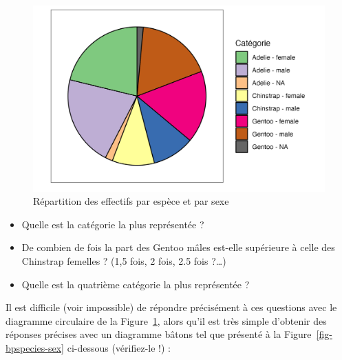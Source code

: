 \documentclass[
  letterpaper,
  DIV=11,
  numbers=noendperiod]{scrreprt}
\providecommand{\tightlist}{%
  \setlength{\itemsep}{0pt}\setlength{\parskip}{0pt}}\usepackage{longtable,booktabs,array}
\begin{document}
\begin{figure}

{\centering \includegraphics{./03-visualization_files/figure-pdf/fig-pie-1.png}

}

\caption{\label{fig-pie}Répartition des effectifs par espèce et par
sexe}

\end{figure}

\begin{itemize}
\tightlist
\item
  Quelle est la catégorie la plus représentée ?
\item
  De combien de fois la part des Gentoo mâles est-elle supérieure à
  celle des Chinstrap femelles ? (1,5 fois, 2 fois, 2.5 fois ?\ldots)
\item
  Quelle est la quatrième catégorie la plus représentée ?
\end{itemize}

Il est difficile (voir impossible) de répondre précisément à ces
questions avec le diagramme circulaire de la Figure~\ref{fig-pie}, alors
qu'il est très simple d'obtenir des réponses précises avec un diagramme
bâtons tel que présenté à la Figure~\ref{fig-bpspecies-sex} ci-dessous
(vérifiez-le !) :
\end{document}
